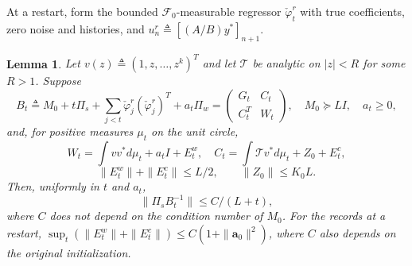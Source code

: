 \documentclass[11pt,reqno]{amsart}
\numberwithin{equation}{section}
\newtheorem{lemma}[theorem]{Lemma}
\theoremstyle{definition}
\theoremstyle{remark}
\newcommand{\F}{\mathcal F}
\newcommand{\phc}{\check{\varphi}}
\begin{document}
At a restart, form the bounded $\F_0$-measurable regressor $\phc_t^r$ with true coefficients, zero noise and histories, and $u_n^r\triangleq[(A/B)y^*]_{n+1}$.

\begin{lemma}\label{lem:inverse}
Let $v(z)\triangleq(1,z,\ldots,z^k)^T$ and let $\mathcal T$ be analytic on
$|z|<R$ for some $R>1$. Suppose
\[
 B_t\triangleq M_0+t\Pi_s+\sum_{j<t}\phc_j^r(\phc_j^r)^T
       +a_t\Pi_w=\begin{pmatrix}G_t&C_t\\ C_t^T&W_t\end{pmatrix},
 \quad M_0\succeq LI,\quad a_t\ge0,
\]
and, for positive measures $\mu_t$ on the unit circle,
\[
 W_t=\int vv^*d\mu_t+a_tI+E_t^w,\quad
 C_t=\int\mathcal T v^*d\mu_t+Z_0+E_t^c,
\]
\[
 \|E_t^w\|+\|E_t^c\|\le L/2,\qquad\|Z_0\|\le K_0L.
\]
Then, uniformly in $t$ and $a_t$,
\begin{equation}\label{eq:inverse}
 \|\Pi_sB_t^{-1}\|\le C/(L+t),
\end{equation}
where $C$ does not depend on the condition number of $M_0$.
For the records at a restart, $\sup_t(\|E_t^w\|+\|E_t^c\|)\le C(1+\|\mathbf a_0\|^2)$, where $C$ also depends on the original initialization.
\end{lemma}
\end{document}
